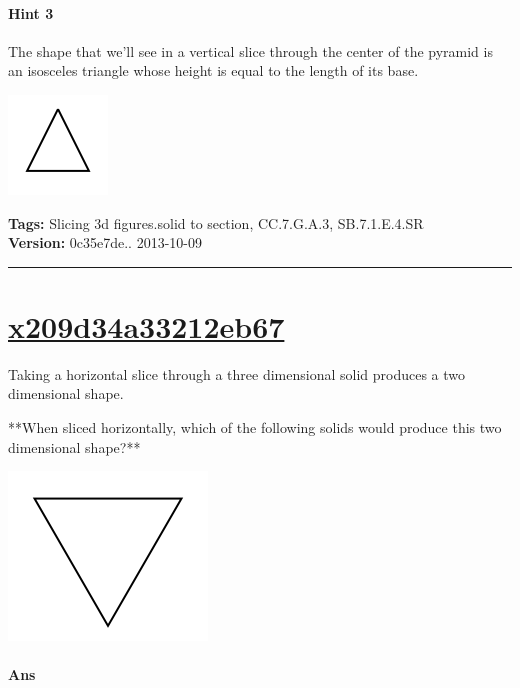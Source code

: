 \documentclass[twocolumn,10pt]{article}
\def\shrinkfactor{0.4}
\begin{document}
\paragraph{Hint 3}The shape that we'll see in a vertical slice through the center of the pyramid is an isosceles triangle whose height is equal to the length of its base.  

\includegraphics[scale=\shrinkfactor]{figures/d443e0deb4dc18ef30fbf9139d310266f460b66b.png}




\medskip
\noindent
\textbf{Tags:} {\footnotesize Slicing 3d figures.solid to section, CC.7.G.A.3, SB.7.1.E.4.SR}\\
\textbf{Version:} 0c35e7de.. 2013-10-09
\smallskip\hrule





\section{\href{https://www.khanacademy.org/devadmin/content/items/x209d34a33212eb67}{x209d34a33212eb67}}

\noindent
Taking a horizontal slice through a three dimensional solid produces a two dimensional shape.

**When sliced horizontally, which of the following solids would produce this two dimensional shape?**   

\includegraphics[scale=\shrinkfactor]{figures/788a8b56b0b7607b1ee5b54e7626cf4b802e373f.png} 


\paragraph{Ans} 
\end{document}
